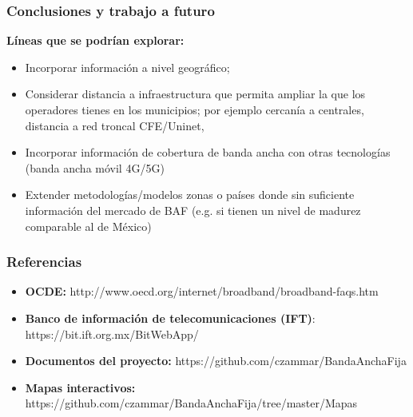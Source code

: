 \documentclass[xcolor=dvipsnames, compress]{beamer}
\begin{document}
\begin{frame}	
\frametitle{Conclusiones y trabajo a futuro}		
\textbf{Líneas que se podrían explorar:}

\begin{itemize}
			\item Incorporar información a nivel geográfico;
			\item Considerar distancia a infraestructura que permita ampliar la que los operadores tienes en los municipios; por ejemplo cercanía a centrales, distancia a red troncal CFE/Uninet,
			\item Incorporar información de cobertura de banda ancha con otras tecnologías (banda ancha móvil 4G/5G)
			\item Extender metodologías/modelos zonas o países donde sin suficiente información del mercado de BAF (e.g. si tienen un nivel de madurez comparable al de México)
		\end{itemize}	

\end{frame}

\begin{frame}
\frametitle{Referencias}		
\begin{itemize}
	
	\item \textbf{OCDE:} http://www.oecd.org/internet/broadband/broadband-faqs.htm
	\item \textbf{Banco de información de telecomunicaciones (IFT)}: https://bit.ift.org.mx/BitWebApp/
	\item \textbf{Documentos del proyecto:} https://github.com/czammar/BandaAnchaFija
	\item \textbf{Mapas interactivos:} https://github.com/czammar/BandaAnchaFija/tree/master/Mapas

\end{itemize}

\end{frame}

%
 
\end{document}
